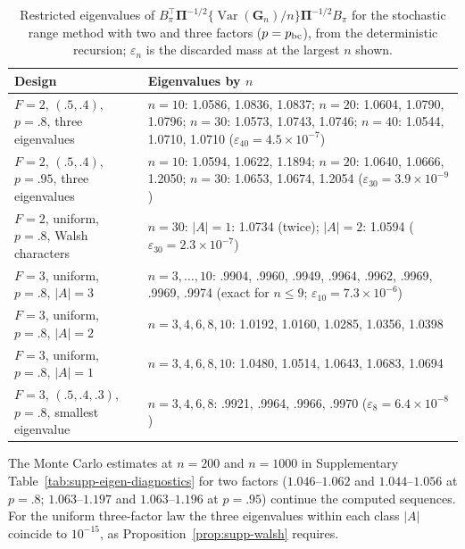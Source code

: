 \documentclass[12pt,a4paper]{article}
\theoremstyle{definition}
\theoremstyle{remark}\newtheorem{remark}{Remark}
\numberwithin{equation}{section}
\newcommand{\Var}{\operatorname{Var}}
\begin{document}
\begin{table}[!htbp]
\centering
\caption{Restricted eigenvalues of $B_\pi^\top\bm\Pi^{-1/2}\{\Var(\bm G_n)/n\}\bm\Pi^{-1/2}B_\pi$ for the stochastic range method with two and three factors ($p=p_{\rm bc}$), from the deterministic recursion; $\varepsilon_n$ is the discarded mass at the largest $n$ shown.}
\label{tab:supp-exact-sign-23}
\begin{threeparttable}
\begin{singlespace}
\footnotesize
\begin{tabular}{@{}p{56mm}p{98mm}@{}}
\toprule
Design & Eigenvalues by $n$\\
\midrule
$F=2$, $(.5,.4)$, $p=.8$, three eigenvalues & $n=10$: 1.0586, 1.0836, 1.0837; $n=20$: 1.0604, 1.0790, 1.0796; $n=30$: 1.0573, 1.0743, 1.0746; $n=40$: 1.0544, 1.0710, 1.0710 ($\varepsilon_{40}=4.5\times10^{-7}$)\\
$F=2$, $(.5,.4)$, $p=.95$, three eigenvalues & $n=10$: 1.0594, 1.0622, 1.1894; $n=20$: 1.0640, 1.0666, 1.2050; $n=30$: 1.0653, 1.0674, 1.2054 ($\varepsilon_{30}=3.9\times10^{-9}$)\\
$F=2$, uniform, $p=.8$, Walsh characters & $n=30$: $|A|=1$: 1.0734 (twice); $|A|=2$: 1.0594 ($\varepsilon_{30}=2.3\times10^{-7}$)\\
$F=3$, uniform, $p=.8$, $|A|=3$ & $n=3,\ldots,10$: .9904, .9960, .9949, .9964, .9962, .9969, .9969, .9974 (exact for $n\le9$; $\varepsilon_{10}=7.3\times10^{-6}$)\\
$F=3$, uniform, $p=.8$, $|A|=2$ & $n=3,4,6,8,10$: 1.0192, 1.0160, 1.0285, 1.0356, 1.0398\\
$F=3$, uniform, $p=.8$, $|A|=1$ & $n=3,4,6,8,10$: 1.0480, 1.0514, 1.0643, 1.0683, 1.0694\\
$F=3$, $(.5,.4,.3)$, $p=.8$, smallest eigenvalue & $n=3,4,6,8$: .9921, .9964, .9966, .9970 ($\varepsilon_8=6.4\times10^{-8}$)\\
\bottomrule
\end{tabular}
\begin{tablenotes}[flushleft]\footnotesize
\item The Monte Carlo estimates at $n=200$ and $n=1000$ in Supplementary Table~\ref{tab:supp-eigen-diagnostics} for two factors ($1.046$--$1.062$ and $1.044$--$1.056$ at $p=.8$; $1.063$--$1.197$ and $1.063$--$1.196$ at $p=.95$) continue the computed sequences. For the uniform three-factor law the three eigenvalues within each class $|A|$ coincide to $10^{-15}$, as Proposition~\ref{prop:supp-walsh} requires.
\end{tablenotes}
\end{singlespace}
\end{threeparttable}
\end{table}
\end{document}
